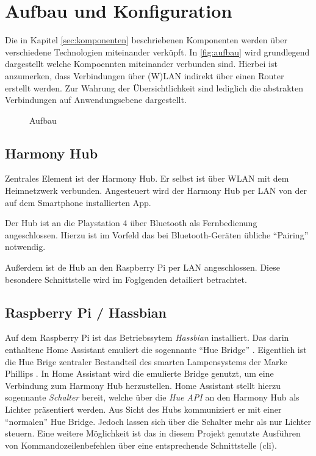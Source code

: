 \section{Aufbau und Konfiguration}\label{sec:aufbau}
Die in Kapitel \ref{sec:komponenten} \textit{} beschriebenen Komponenten werden über verschiedene Technologien miteinander verküpft.
In \autoref{fig:aufbau} wird grundlegend dargestellt welche Kompoennten miteinander verbunden sind.
Hierbei ist anzumerken, dass Verbindungen über (W)LAN indirekt über einen Router erstellt werden.
Zur Wahrung der Übersichtlichkeit sind lediglich die abstrakten Verbindungen auf Anwendungsebene dargestellt.

\begin{figure}[ht!]
    \centering
    \resizebox{\textwidth}{!}{
        
    }
    \caption{Aufbau}
    \label{fig:aufbau}
\end{figure}

\subsection{Harmony Hub}\label{sec:aufbau-hub}
Zentrales Element ist der Harmony Hub.
Er selbst ist über WLAN mit dem Heimnetzwerk verbunden.
Angesteuert wird der Harmony Hub per LAN von der auf dem Smartphone installierten App.

Der Hub ist an die Playstation 4 über Bluetooth als Fernbedienung angeschlossen.
Hierzu ist im Vorfeld das bei Bluetooth-Geräten übliche \enquote{Pairing} notwendig.

Außerdem ist de Hub an den Raspberry Pi per LAN angeschlossen.
Diese besondere Schnittstelle wird im Foglgenden detailiert betrachtet.

\subsection{Raspberry Pi / Hassbian}\label{sec:aufbau-hassbian}
Auf dem Raspberry Pi ist das Betriebssytem \textit{Hassbian} installiert.
Das darin enthaltene Home Assistant emuliert die sogennante \enquote{Hue Bridge} \cite{Emulated83:online}.
Eigentlich ist die Hue Brige zentraler Bestandteil des smarten Lampensystems der Marke Phillips \cite{HueBridg65:online}.
In Home Assistant wird die emulierte Bridge genutzt, um eine Verbindung zum Harmony Hub herzustellen.
Home Assistant stellt hierzu sogennante \textit{Schalter} bereit, welche über die \textit{Hue API} an den Harmony Hub als Lichter präsentiert werden.
Aus Sicht des Hubs kommuniziert er mit einer \enquote{normalen} Hue Bridge.
Jedoch lassen sich über die Schalter mehr als nur Lichter steuern.
Eine weitere Möglichkeit ist das in diesem Projekt genutzte Ausführen von Kommandozeilenbefehlen über eine entsprechende Schnittstelle (\ac{cli}).

